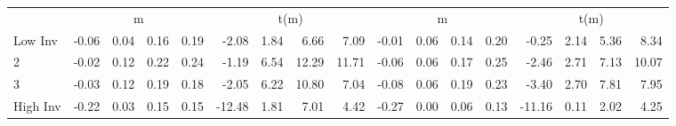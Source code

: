 \begin{table}[!ht]
\begin{tabular}{lrrrrrrrrrrrrrrrr}
  
    
      & \multicolumn{4}{c}{m} & \multicolumn{4}{c}{t(m)}
    
      & \multicolumn{4}{c}{m} & \multicolumn{4}{c}{t(m)}
    
    \\
      \cmidrule(r){2-5} \cmidrule(r){6-9} \cmidrule(r){10-13} \cmidrule(r){14-17}

    Low Inv   & -0.06  & 0.04  & 0.16  & 0.19  & -2.08  & 1.84  & 6.66  & 7.09  & -0.01  & 0.06  & 0.14  & 0.20  & -0.25  & 2.14  & 5.36  & 8.34  \\
           2  & -0.02  & 0.12  & 0.22  & 0.24  & -1.19  & 6.54  & 12.29  & 11.71  & -0.06  & 0.06  & 0.17  & 0.25  & -2.46  & 2.71  & 7.13  & 10.07  \\
           3  & -0.03  & 0.12  & 0.19  & 0.18  & -2.05  & 6.22  & 10.80  & 7.04  & -0.08  & 0.06  & 0.19  & 0.23  & -3.40  & 2.70  & 7.81  & 7.95  \\
    High Inv  & -0.22  & 0.03  & 0.15  & 0.15  & -12.48  & 1.81  & 7.01  & 4.42  & -0.27  & 0.00  & 0.06  & 0.13  & -11.16  & 0.11  & 2.02  & 4.25  \\

  

  \bottomrule
\end{tabular}
\label{tbl:32_Size_BM_Inv_C97b}
\end{table}